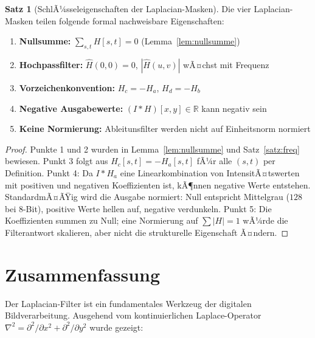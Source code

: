 ﻿\documentclass[a4paper,12pt]{article}
\theoremstyle{definition}
\newtheorem{satz}{Satz}
\begin{document}
\begin{satz}[SchlÃ¼sseleigenschaften der Laplacian-Masken]
Die vier Laplacian-Masken teilen folgende formal nachweisbare Eigenschaften:
\begin{enumerate}
    \item \textbf{Nullsumme:} $\sum_{s,t} H[s,t] = 0$ (Lemma~\ref{lem:nullsumme})
    \item \textbf{Hochpassfilter:} $\hat{H}(0,0) = 0$, $|\hat{H}(u,v)|$ wÃ¤chst mit Frequenz
    \item \textbf{Vorzeichenkonvention:} $H_c = -H_a$, $H_d = -H_b$
    \item \textbf{Negative Ausgabewerte:} $(I * H)[x,y] \in \mathbb{R}$ kann negativ sein
    \item \textbf{Keine Normierung:} Ableitunsfilter werden nicht auf Einheitsnorm normiert
\end{enumerate}
\end{satz}

\begin{proof}
    Punkte 1 und 2 wurden in Lemma~\ref{lem:nullsumme} und Satz~\ref{satz:freq} bewiesen.
    Punkt 3 folgt aus $H_c[s,t] = -H_a[s,t]$ fÃ¼r alle $(s,t)$ per Definition.
    Punkt 4: Da $I * H_a$ eine Linearkombination von IntensitÃ¤tswerten mit positiven und
    negativen Koeffizienten ist, kÃ¶nnen negative Werte entstehen. StandardmÃ¤ÃŸig wird die
    Ausgabe normiert: Null entspricht Mittelgrau ($128$ bei 8-Bit), positive Werte hellen auf,
    negative verdunkeln.
    Punkt 5: Die Koeffizienten summen zu Null; eine Normierung auf $\sum|H| = 1$ wÃ¼rde die
    Filterantwort skalieren, aber nicht die strukturelle Eigenschaft Ã¤ndern. \qedhere
\end{proof}

\section{Zusammenfassung}

Der Laplacian-Filter ist ein fundamentales Werkzeug der digitalen Bildverarbeitung. Ausgehend
vom kontinuierlichen Laplace-Operator $\nabla^2 = \partial^2/\partial x^2 + \partial^2/\partial y^2$
wurde gezeigt:
\end{document}
